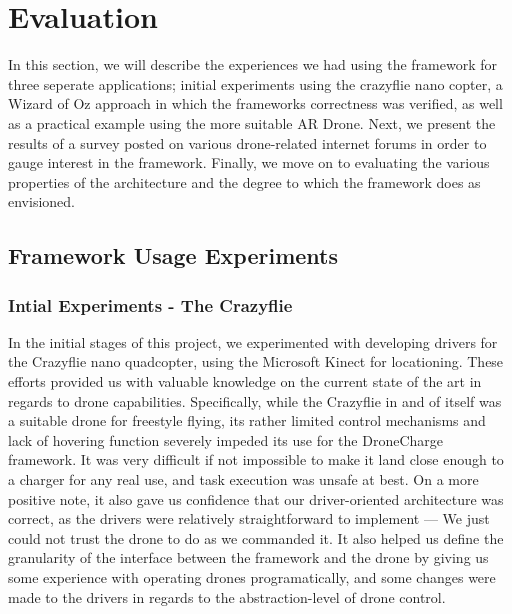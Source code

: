 \section{Evaluation}
In this section, we will describe the experiences we had using the framework for three seperate applications; initial experiments using the crazyflie nano copter, a Wizard of Oz approach in which the frameworks correctness was verified, as well as a practical example using the more suitable AR Drone. Next, we present the results of a survey posted on various drone-related internet forums in order to gauge interest in the framework. Finally, we move on to evaluating the various properties of the architecture and the degree to which the framework does as envisioned.

\subsection{Framework Usage Experiments}
\subsubsection{Intial Experiments - The Crazyflie}
In the initial stages of this project, we experimented with developing drivers for the Crazyflie nano quadcopter, using the Microsoft Kinect for locationing. These efforts provided us with valuable knowledge on the current state of the art in regards to drone capabilities. Specifically, while the Crazyflie in and of itself was a suitable drone for freestyle flying, its rather limited control mechanisms and lack of hovering function severely impeded its use for the DroneCharge framework. It was very difficult if not impossible to make it land close enough to a charger for any real use, and task execution was unsafe at best. On a more positive note, it also gave us confidence that our driver-oriented architecture was correct, as the drivers were relatively straightforward to implement --- We just could not trust the drone to do as we commanded it. It also helped us define the granularity of the interface between the framework and the drone by giving us some experience with operating drones programatically, and some changes were made to the drivers in regards to the abstraction-level of drone control.

